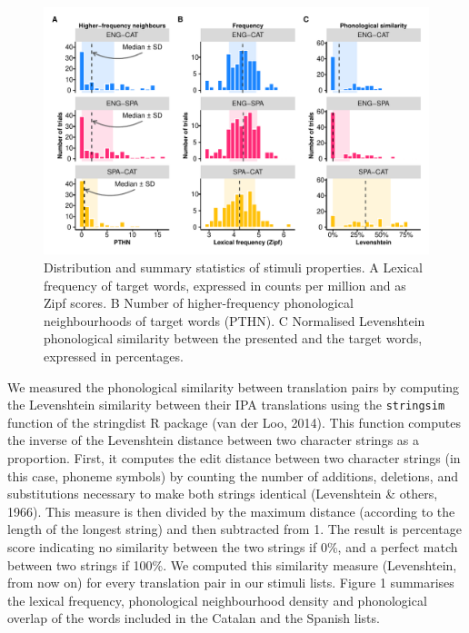 \documentclass[
  english,
  man,floatsintext]{apa6}
\begin{document}
\begin{figure}
\includegraphics[width=1\linewidth]{manuscript_files/figure-latex/stimuliplot-1} \caption{Distribution and summary statistics of stimuli properties. A\) Lexical frequency of target words, expressed in counts per million and as Zipf scores. B\) Number of higher-frequency phonological neighbourhoods of target words (PTHN). C\) Normalised Levenshtein phonological similarity between the presented and the target words, expressed in percentages.}\label{fig:stimuliplot}
\end{figure}

We measured the phonological similarity between translation pairs by computing the Levenshtein similarity between their IPA translations using the \texttt{stringsim} function of the stringdist R package (van der Loo, 2014). This function computes the inverse of the Levenshtein distance between two character strings as a proportion. First, it computes the edit distance between two character strings (in this case, phoneme symbols) by counting the number of additions, deletions, and substitutions necessary to make both strings identical (Levenshtein \& others, 1966). This measure is then divided by the maximum distance (according to the length of the longest string) and then subtracted from 1. The result is percentage score indicating no similarity between the two strings if 0\%, and a perfect match between two strings if 100\%. We computed this similarity measure (Levenshtein, from now on) for every translation pair in our stimuli lists. Figure 1 summarises the lexical frequency, phonological neighbourhood density and phonological overlap of the words included in the Catalan and the Spanish lists.
\end{document}
